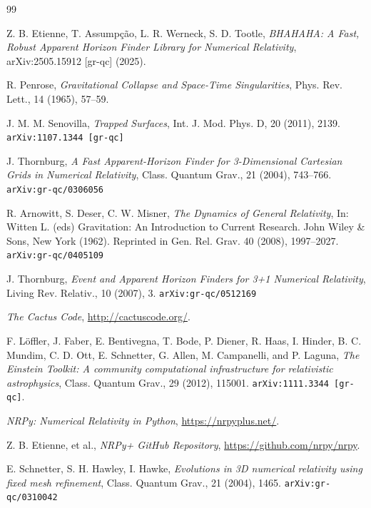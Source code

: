 \documentclass[a4paper,11pt]{article}
\begin{document}
\begin{thebibliography}{99} %

    {Z. B. Etienne, T. Assump\c{c}\~{a}o, L. R. Werneck, S. D. Tootle,
    {\em BHAHAHA: A Fast, Robust Apparent Horizon Finder Library for Numerical Relativity},
    arXiv:2505.15912 [gr-qc] (2025).}

    {R. Penrose,
    {\em Gravitational Collapse and Space-Time Singularities},
    Phys. Rev. Lett., 14 (1965), 57--59.}

    {J. M. M. Senovilla,
    {\em Trapped Surfaces},
    Int. J. Mod. Phys. D, 20 (2011), 2139. \texttt{arXiv:1107.1344 [gr-qc]}}

    {J. Thornburg,
    {\em A Fast Apparent-Horizon Finder for 3-Dimensional Cartesian Grids in Numerical Relativity},
    Class. Quantum Grav., 21 (2004), 743--766. \texttt{arXiv:gr-qc/0306056}}

    {R. Arnowitt, S. Deser, C. W. Misner,
    {\em The Dynamics of General Relativity},
    In: Witten L. (eds) Gravitation: An Introduction to Current Research. John Wiley \& Sons, New York (1962).
    Reprinted in Gen. Rel. Grav. 40 (2008), 1997--2027. \texttt{arXiv:gr-qc/0405109}}

    {J. Thornburg,
    {\em Event and Apparent Horizon Finders for 3+1 Numerical Relativity},
    Living Rev. Relativ., 10 (2007), 3. \texttt{arXiv:gr-qc/0512169}}

    {{\em The Cactus Code}, \url{http://cactuscode.org/}.}

    {F. L{\"o}ffler, J. Faber, E. Bentivegna, T. Bode, P. Diener, R. Haas, I. Hinder, B. C. Mundim, C. D. Ott, E. Schnetter, G. Allen, M. Campanelli, and P. Laguna,
    {\em The Einstein Toolkit: A community computational infrastructure for relativistic astrophysics},
    Class. Quantum Grav., 29 (2012), 115001. \texttt{arXiv:1111.3344 [gr-qc]}.}

    {\em NRPy: Numerical Relativity in Python}, \url{https://nrpyplus.net/}.

    {Z. B. Etienne, et al.,
    {\em NRPy+ GitHub Repository},
    \url{https://github.com/nrpy/nrpy}.}

    {E. Schnetter, S. H. Hawley, I. Hawke,
    {\em Evolutions in 3D numerical relativity using fixed mesh refinement},
    Class. Quantum Grav., 21 (2004), 1465. \texttt{arXiv:gr-qc/0310042}}


\end{thebibliography}
\end{document}
